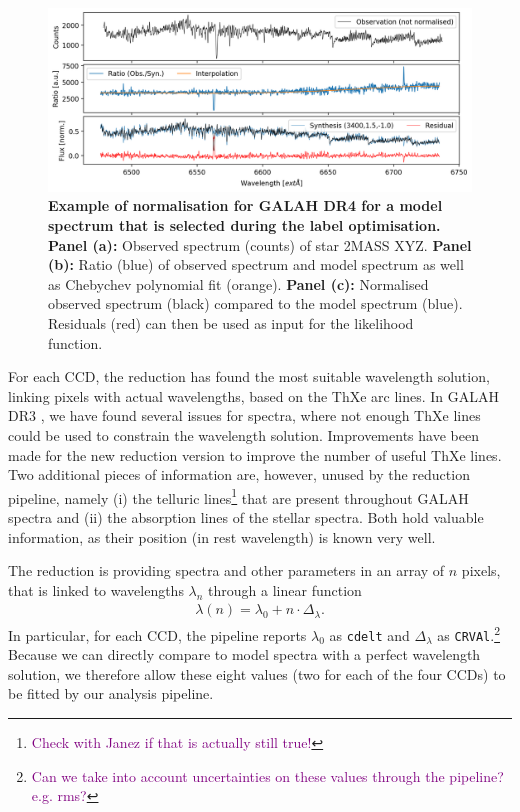\documentclass[
  journal=pasa,
  manuscript=research-paper, %
  year=2021,
  volume=37,
]{cup-journal}
\newcommand{\SB}[1]{{\textcolor{purple}{#1}}}
\begin{document}
\begin{figure}[hbt!]
 \centering
 \includegraphics[width=\textwidth]{figures/Nuisance_example.png}
 \caption{
 \textbf{Example of normalisation for GALAH DR4 for a model spectrum that is selected during the label optimisation.}
 \textbf{Panel (a):} Observed spectrum (counts) of star 2MASS XYZ.
 \textbf{Panel (b):} Ratio (blue) of observed spectrum and model spectrum as well as Chebychev polynomial fit (orange).
 \textbf{Panel (c):} Normalised observed spectrum (black) compared to the model spectrum (blue). Residuals (red) can then be used as input for the likelihood function.
 }
 \label{fig:ratio_normalisation}
\end{figure}

For each CCD, the reduction has found the most suitable wavelength solution, linking pixels with actual wavelengths, based on the ThXe arc lines. In GALAH DR3 \citep{Buder2021}, we have found several issues for spectra, where not enough ThXe lines could be used to constrain the wavelength solution. Improvements have been made for the new reduction version to improve the number of useful ThXe lines. Two additional pieces of information are, however, unused by the reduction pipeline, namely (i) the telluric lines\footnote{\SB{Check with Janez if that is actually still true!}} that are present throughout GALAH spectra and (ii) the absorption lines of the stellar spectra. Both hold valuable information, as their position (in rest wavelength) is known very well.

The reduction is providing spectra and other parameters in an array of $n$ pixels, that is linked to wavelengths $\lambda_n$ through a linear function
\begin{align} \label{eq:wavelength_solution}
    \lambda (n) = \lambda_0 + n \cdot \Delta_\lambda.
\end{align}
In particular, for each CCD, the pipeline reports $\lambda_0$ as \texttt{cdelt} and $\Delta_\lambda$ as \texttt{CRVAl}.\footnote{\SB{Can we take into account uncertainties on these values through the pipeline? e.g. rms?}}
Because we can directly compare to model spectra with a perfect wavelength solution, we therefore allow these eight values (two for each of the four CCDs) to be fitted by our analysis pipeline.
\end{document}
